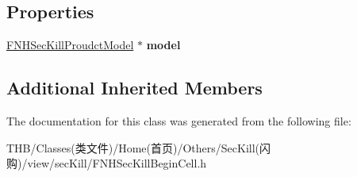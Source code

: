 \subsection*{Properties}
\begin{DoxyCompactItemize}
\item 
\mbox{\label{interface_f_n_h_sec_kill_begin_cell_a6b99031614d6d1bb35b2656540f7b270}} 
\mbox{\hyperlink{interface_f_n_h_sec_kill_proudct_model}{F\+N\+H\+Sec\+Kill\+Proudct\+Model}} $\ast$ {\bfseries model}
\end{DoxyCompactItemize}
\subsection*{Additional Inherited Members}


The documentation for this class was generated from the following file\+:\begin{DoxyCompactItemize}
\item 
T\+H\+B/\+Classes(类文件)/\+Home(首页)/\+Others/\+Sec\+Kill(闪购)/view/sec\+Kill/F\+N\+H\+Sec\+Kill\+Begin\+Cell.\+h\end{DoxyCompactItemize}
